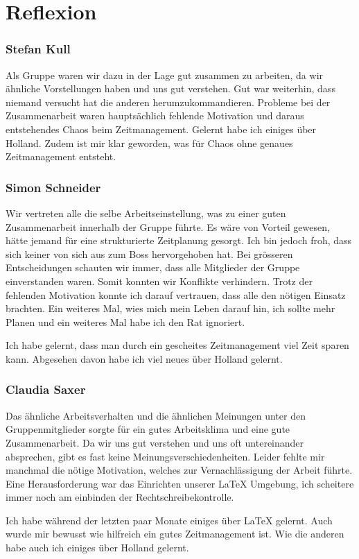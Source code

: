 \part{Reflexion}

\section{Stefan Kull}
Als Gruppe waren wir dazu in der Lage gut zusammen zu arbeiten, da wir 
ähnliche Vorstellungen haben und uns gut verstehen. Gut war weiterhin, dass niemand 
versucht hat die anderen herumzukommandieren. 
Probleme bei der Zusammenarbeit waren hauptsächlich fehlende Motivation und daraus 
entstehendes Chaos beim Zeitmanagement.
Gelernt habe ich einiges über Holland. Zudem ist mir klar geworden, was für Chaos ohne genaues
Zeitmanagement entsteht.

\section{Simon Schneider}
Wir vertreten alle die selbe Arbeitseinstellung, was zu einer guten Zusammenarbeit innerhalb
der Gruppe führte.
Es wäre von Vorteil gewesen, hätte jemand für eine strukturierte Zeitplanung gesorgt.
Ich bin jedoch froh, dass sich keiner von sich aus zum Boss hervorgehoben hat.
Bei grösseren Entscheidungen schauten wir immer, dass alle Mitglieder der Gruppe einverstanden
waren. Somit konnten wir Konflikte verhindern. 
Trotz der fehlenden Motivation konnte ich darauf vertrauen, dass alle den nötigen Einsatz
brachten.
Ein weiteres Mal, wies mich mein Leben darauf hin, ich sollte mehr Planen und ein 
weiteres Mal habe ich den Rat ignoriert. 

Ich habe gelernt, dass man durch ein gescheites Zeitmanagement viel Zeit sparen kann.
Abgesehen davon habe ich viel neues über Holland gelernt. 

\section{Claudia Saxer}
Das ähnliche Arbeitsverhalten und die ähnlichen Meinungen unter den Gruppenmitglieder sorgte
für ein gutes Arbeitsklima und eine gute Zusammenarbeit. Da wir uns gut verstehen und uns 
oft untereinander absprechen, gibt es fast keine Meinungsverschiedenheiten. 
Leider fehlte mir manchmal die nötige Motivation, welches zur Vernachlässigung der Arbeit 
führte. 
Eine Herausforderung war das Einrichten unserer {LaTeX} Umgebung, ich scheitere immer noch
am einbinden der Rechtschreibekontrolle.

Ich habe während der letzten paar Monate einiges über {LaTeX} gelernt.
Auch wurde mir bewusst wie hilfreich ein gutes Zeitmanagement ist. 
Wie die anderen habe auch ich einiges über Holland gelernt.